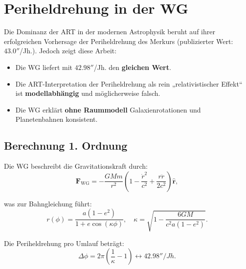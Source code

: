 \section{Periheldrehung in der WG}
Die Dominanz der ART in der modernen Astrophysik beruht auf ihrer erfolgreichen Vorhersage der Periheldrehung des Merkurs (publizierter Wert: $43.0''$/Jh.). Jedoch zeigt diese Arbeit:
\begin{itemize}
    \item Die WG liefert mit $42.98''$/Jh. den \textbf{gleichen Wert}.
    \item Die ART-Interpretation der Periheldrehung als rein „relativistischer Effekt“ ist \textbf{modellabhängig} und möglicherweise falsch.
    \item Die WG erklärt \textbf{ohne Raummodell} Galaxienrotationen und Planetenbahnen konsistent.
\end{itemize}

\subsection{Berechnung 1. Ordnung}
Die WG beschreibt die Gravitationskraft durch:
\begin{equation}
\mathbf{F}_{\text{WG}} = -\frac{GMm}{r^2}\left(1 - \frac{\dot{r}^2}{c^2} + \frac{r\ddot{r}}{2c^2}\right)\hat{\mathbf{r}},
\end{equation}

was zur Bahngleichung führt:
\begin{equation}
r(\phi) = \frac{a(1-e^2)}{1 + e \cos\left(\kappa \phi\right)}, \quad \kappa = \sqrt{1 - \frac{6GM}{c^2 a (1-e^2)}}.
\end{equation}

Die Periheldrehung pro Umlauf beträgt:
\begin{equation}
\Delta\phi = 2\pi\left(\frac{1}{\kappa} - 1\right) \leftrightarrow 42.98'' /Jh.
\end{equation}
